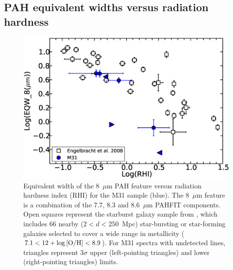 %


\subsection{PAH equivalent widths versus radiation hardness}
\label{sect:eqw_rh}


\begin{figure}
\centering
\includegraphics[scale=0.25]{./fig10.eps}
\caption{Equivalent width of the 8~$\mu$m PAH feature versus radiation hardness index (RHI) for the M31 sample (blue). 
The 8~$\mu$m feature is a combination of the 7.7, 8.3 and 8.6~$\mu$m PAHFIT components. 
Open squares represent the starburst galaxy sample from \citet{Engelbracht_2008}, which includes 66 nearby ($2<d<250$~Mpc)
star-bursting or star-forming galaxies selected to cover a wide range in metallicity ($7.1<12+\log{\rm[O/H]}<8.9$).
 For M31 spectra with undetected lines, triangles represent $3\sigma$ upper (left-pointing triangles) and lower (right-pointing triangles)  limits.} 
\label{englII}
\end{figure}


